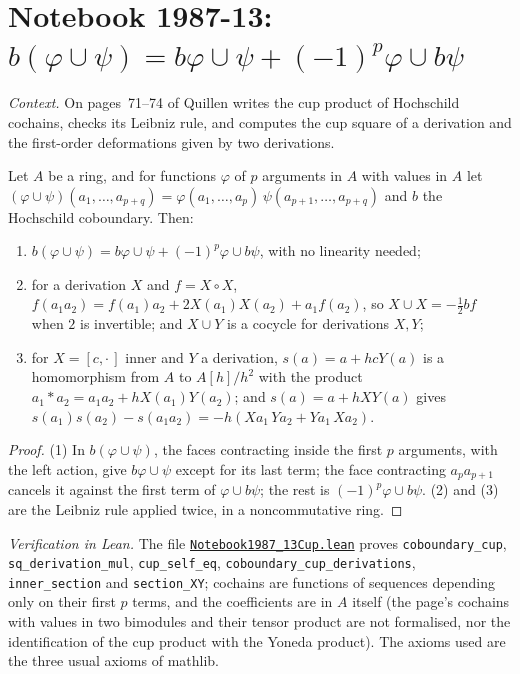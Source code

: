 \section[Notebook 1987-13: the cup product of Hochschild cochains]{Notebook 1987-13: $b(\varphi \cup \psi) = b\varphi \cup \psi + (-1)^p\varphi \cup b\psi$\protect{}}\label{sec:quillen-1987-13-cup}

\emph{Context.} On pages~71--74 of  Quillen writes the cup product of Hochschild cochains, checks its Leibniz rule, and computes the cup square of a derivation and the first-order deformations given by two derivations.

\begin{encadre}
\begin{theoreme}\label{thm:quillen-1987-13-cup}
Let $A$ be a ring, and for functions $\varphi$ of $p$ arguments in $A$ with values in $A$ let $(\varphi \cup \psi)(a_1, \dots, a_{p+q}) = \varphi(a_1, \dots, a_p)\,\psi(a_{p+1}, \dots, a_{p+q})$ and $b$ the Hochschild coboundary. Then:
\begin{enumerate}
\item $b(\varphi \cup \psi) = b\varphi \cup \psi + (-1)^p\varphi \cup b\psi$, with no linearity needed;
\item for a derivation $X$ and $f = X \circ X$, $f(a_1a_2) = f(a_1)a_2 + 2X(a_1)X(a_2) + a_1f(a_2)$, so $X \cup X = -\tfrac12 bf$ when $2$ is invertible; and $X \cup Y$ is a cocycle for derivations $X, Y$;
\item for $X = [c, \cdot\,]$ inner and $Y$ a derivation, $s(a) = a + hcY(a)$ is a homomorphism from $A$ to $A[h]/h^2$ with the product $a_1 * a_2 = a_1a_2 + hX(a_1)Y(a_2)$; and $s(a) = a + hXY(a)$ gives $s(a_1)s(a_2) - s(a_1a_2) = -h(Xa_1\,Ya_2 + Ya_1\,Xa_2)$.
\end{enumerate}
\end{theoreme}
\end{encadre}

\begin{proof}
(1) In $b(\varphi \cup \psi)$, the faces contracting inside the first $p$ arguments, with the left action, give $b\varphi \cup \psi$ except for its last term; the face contracting $a_p a_{p+1}$ cancels it against the first term of $\varphi \cup b\psi$; the rest is $(-1)^p\varphi \cup b\psi$. (2) and (3) are the Leibniz rule applied twice, in a noncommutative ring.
\end{proof}

\emph{Verification in Lean.} The file \href{\leanblobmain/Notebook1987_13Cup.lean}{\texttt{Notebook1987\_13Cup.\allowbreak{}lean}} proves \texttt{coboundary\_cup}, \texttt{sq\_derivation\_mul}, \texttt{cup\_self\_eq}, \texttt{coboundary\_cup\_derivations}, \texttt{inner\_section} and \texttt{section\_XY}; cochains are functions of sequences depending only on their first $p$ terms, and the coefficients are in $A$ itself (the page's cochains with values in two bimodules and their tensor product are not formalised, nor the identification of the cup product with the Yoneda product). The axioms used are the three usual axioms of mathlib.

